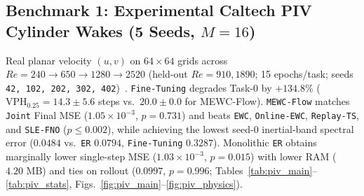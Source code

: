 \documentclass[11pt,a4paper]{article}
\begin{document}
\subsection{Benchmark 1: Experimental Caltech PIV Cylinder Wakes (5 Seeds, $M=16$)}

Real planar velocity $(u, v)$ on $64\times 64$ grids across $Re = 240 \to 650 \to 1280 \to 2520$ (held-out $Re = 910, 1890$; 15 epochs/task; seeds \texttt{42, 102, 202, 302, 402})~\cite{renn2026piv}. \texttt{Fine-Tuning} degrades Task-0 by $+134.8\%$ ($\text{VPH}_{0.25}=14.3\pm 5.6$ steps vs.\ $20.0\pm 0.0$ for MEWC-Flow). \texttt{MEWC-Flow} matches \texttt{Joint} Final MSE ($1.05\times 10^{-3}$, $p=0.731$) and beats \texttt{EWC}, \texttt{Online-EWC}, \texttt{Replay-TS}, and \texttt{SLE-FNO} ($p \le 0.002$), while achieving the lowest seed-0 inertial-band spectral error ($0.0484$ vs.\ \texttt{ER} $0.0794$, \texttt{Fine-Tuning} $0.3287$). Monolithic \texttt{ER} obtains marginally lower single-step MSE ($1.03\times 10^{-3}$, $p=0.015$) with lower RAM ($4.20\text{ MB}$) and ties on rollout ($0.0997$, $p=0.996$; Tables~\ref{tab:piv_main}--\ref{tab:piv_stats}, Figs.~\ref{fig:piv_main}--\ref{fig:piv_physics}).
\end{document}
